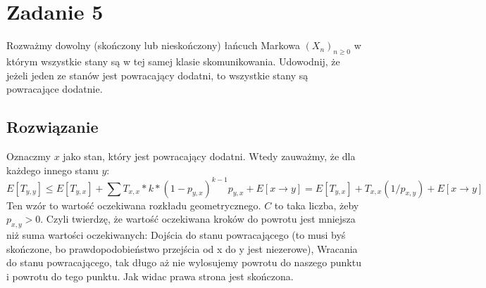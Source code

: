 \section{Zadanie 5}
Rozważmy dowolny (skończony lub nieskończony) łańcuch Markowa \((X_n)_{n \geq 0}\) w którym wszystkie stany są w tej samej klasie skomunikowania. Udowodnij, że jeżeli jeden ze stanów jest powracający dodatni, to wszystkie stany są powracające dodatnie.

\subsection*{Rozwiązanie}
Oznaczmy \(x\) jako stan, który jest powracający dodatni. Wtedy zauważmy, że dla każdego innego stanu \(y\):
\[E[T_{y,y}] \leq E[T_{y,x}]+ \sum T_{x,x}*k*(1-p_{y,x})^{k-1}p_{y,x}+E[x\xrightarrow{}y] =  E[T_{y,x}]+T_{x,x}(1/p_{x,y})+E[x\xrightarrow{} y]\]
Ten wzór to wartość oczekiwana rozkładu geometrycznego. \(C\) to taka liczba, żeby \(p_{x,y} >0\). Czyli twierdzę, że wartość oczekiwana kroków do powrotu jest mniejsza niż suma wartości oczekiwanych: Dojścia do stanu powracającego (to musi byś skończone, bo prawdopodobieństwo przejścia od x do y jest niezerowe), Wracania do stanu powracającego, tak długo aż nie wylosujemy powrotu do naszego punktu i powrotu do tego punktu. Jak widac prawa strona jest skończona.
